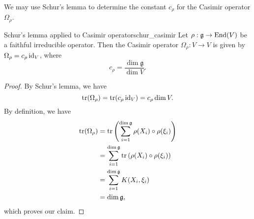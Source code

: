 We may use Schur's lemma to determine the constant \(c_\rho\) for the Casimir operator \(\Omega_\rho\).
\begin{proposition}{Schur's lemma applied to Casimir operator}{schur_casimir}
    Let \(\rho : \mathfrak{g} \to \operatorname{End}(V)\) be a faithful irreducible operator. Then the Casimir operator \(\Omega_\rho : V\to V\) is given by \(\Omega_\rho = c_\rho \operatorname{id}_{V}\), where
    \begin{equation*}
        c_\rho = \frac{\dim{\mathfrak{g}}}{\dim V}.
    \end{equation*}
\end{proposition}
\begin{proof}
    By Schur's lemma, we have
    \begin{equation*}
        \operatorname{tr}(\Omega_\rho) = \operatorname{tr}(c_\rho \operatorname{id}_{V}) = c_\rho \dim{V}.
    \end{equation*}
    By definition, we have
    \begin{align*}
        \operatorname{tr}(\Omega_\rho) &= \operatorname{tr}\left(\sum_{i = 1}^{\dim \mathfrak{g}} \rho(X_i)\circ\rho(\xi_i)\right)\\
                         &= \sum_{i=1}^{\dim\mathfrak{g}} \operatorname{tr}\left(\rho(X_i)\circ\rho(\xi_i)\right)\\
                         &= \sum_{i=1}^{\dim\mathfrak{g}} K(X_i, \xi_i)\\
                         &= \dim\mathfrak{g},
    \end{align*}
    which proves our claim.
\end{proof}
